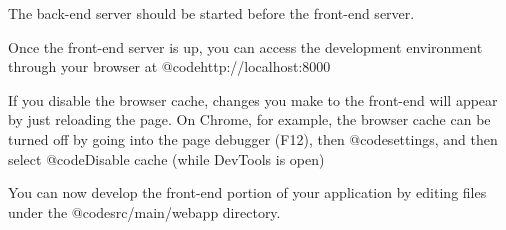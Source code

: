 The back-end server should be started before the front-end server.

Once the front-end server is up, you can access the development
environment through your browser at @code{http://localhost:8000}

If you disable the browser cache, changes you make to the front-end
will appear by just reloading the page.  On Chrome, for example, the
browser cache can be turned off by going into the page debugger (F12),
then @code{settings}, and then select @code{Disable cache (while
DevTools is open)}

You can now develop the front-end portion of your application by
editing files under the @code{src/main/webapp} directory.




